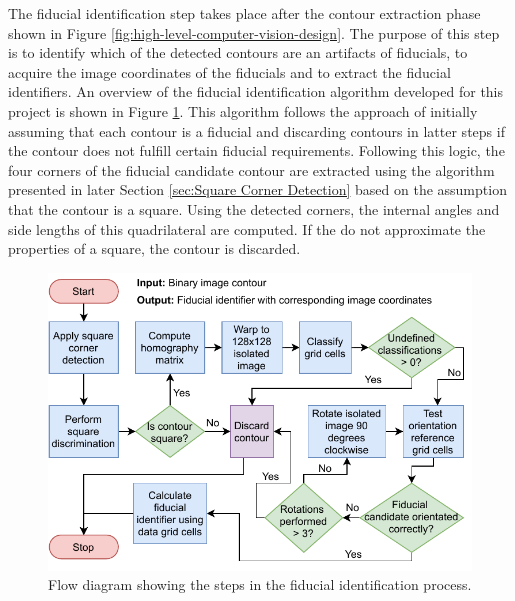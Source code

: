 The fiducial identification step takes place after the contour extraction phase shown in Figure \ref{fig:high-level-computer-vision-design}. The purpose of this step is to identify which of the detected contours are an artifacts of fiducials, to acquire the image coordinates of the fiducials and to extract the fiducial identifiers. An overview of the fiducial identification algorithm developed for this project is shown in Figure \ref{fig:fiducial-identification}. This algorithm follows the approach of initially assuming that each contour is a fiducial and discarding contours in latter steps if the contour does not fulfill certain fiducial requirements. Following this logic, the four corners of the fiducial candidate contour are extracted using the algorithm presented in later Section \ref{sec:Square Corner Detection} based on the assumption that the contour is a square. Using the detected corners, the internal angles and side lengths of this quadrilateral are computed. If the do not approximate the properties of a square, the contour is discarded.

\begin{figure}[!ht]
	\centering
	\includegraphics[scale=1]{figures/fiducial-identification.pdf}
	\caption{Flow diagram showing the steps in the fiducial identification process.}
	\label{fig:fiducial-identification}
\end{figure}

